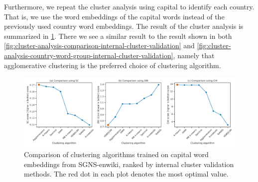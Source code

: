 Furthermore, we repeat the cluster analysis using capital to identify each country. That is, we use the word embeddings of the capital words instead of the previously used country word embeddings. The result of the cluster analysis is summarized in \cref{fig:cluster-analysis-country-capitals-word-group-internal-cluster-validation}. There we see a similar result to the result shown in both \cref{fig:cluster-analysis-comparison-internal-cluster-validation} and \cref{fig:cluster-analysis-country-word-group-internal-cluster-validation}, namely that agglomerative clustering is the preferred choice of clustering algorithm.
\begin{figure}[H]
    \centering
    \includegraphics[width=\textwidth]{thesis/figures/cluster-analysis-country-capitals-word-group-internal-cluster-validation.pdf}
    \caption{Comparison of clustering algorithms trained on capital word embeddings from SGNS-enwiki, ranked by internal cluster validation methods. The red dot in each plot denotes the most optimal value.}
    \label{fig:cluster-analysis-country-capitals-word-group-internal-cluster-validation}
\end{figure}

